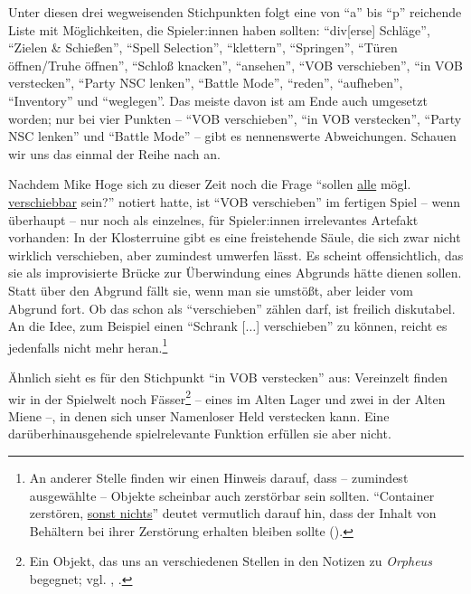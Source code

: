 \documentclass[a5paper,pagesize,numbers=noenddot]{scrbook}
\begin{document}
Unter diesen drei wegweisenden Stichpunkten folgt eine von \enquote{a} bis \enquote{p} reichende Liste mit Möglichkeiten, die Spieler:innen haben sollten:
\enquote{div[erse] Schläge}, \enquote{Zielen \& Schießen}, \enquote{Spell Selection}, \enquote{klettern}, \enquote{Springen}, \enquote{Türen öffnen/Truhe öffnen}, \enquote{Schloß knacken}, \enquote{ansehen}, \enquote{VOB verschieben}, \enquote{in VOB verstecken}, \enquote{Party NSC lenken}, \enquote{Battle Mode}, \enquote{reden}, \enquote{aufheben}, \enquote{Inventory} und \enquote{weglegen}.
Das meiste davon ist am Ende auch umgesetzt worden; nur bei vier Punkten -- \enquote{VOB verschieben}, \enquote{in VOB verstecken}, \enquote{Party NSC lenken} und \enquote{Battle Mode} -- gibt es nennenswerte Abweichungen.
Schauen wir uns das einmal der Reihe nach an.

Nachdem Mike Hoge sich zu dieser Zeit noch die Frage \enquote{sollen \uline{alle} mögl. \uline{verschiebbar} sein?}\autocite[S.~3]{orpheus_interface} notiert hatte, ist \enquote{VOB verschieben} im fertigen Spiel -- wenn überhaupt -- nur noch als einzelnes, für Spieler:innen irrelevantes Artefakt vorhanden:
In der Klosterruine gibt es eine freistehende Säule, die sich zwar nicht wirklich verschieben, aber zumindest umwerfen lässt.
Es scheint offensichtlich, das sie als improvisierte Brücke zur Überwindung eines Abgrunds hätte dienen sollen.
Statt über den Abgrund fällt sie, wenn man sie umstößt, aber leider vom Abgrund fort.
Ob das schon als \enquote{verschieben} zählen darf, ist freilich diskutabel.
An die Idee, zum Beispiel einen \enquote{Schrank [$\ldots$] verschieben}\autocite[S.~3]{orpheus_interface} zu können, reicht es jedenfalls nicht mehr heran.\footnote{An anderer Stelle finden wir einen Hinweis darauf, dass -- zumindest ausgewählte -- Objekte scheinbar auch zerstörbar sein sollten.
\enquote{Container zerstören, \uline{sonst nichts}} deutet vermutlich darauf hin, dass der Inhalt von Behältern bei ihrer Zerstörung erhalten bleiben sollte (\autocite[S.~9]{orpheus_b_scribbles}).}

Ähnlich sieht es für den Stichpunkt \enquote{in VOB verstecken} aus:
Vereinzelt finden wir in der Spielwelt noch Fässer\footnote{Ein Objekt, das uns an verschiedenen Stellen in den Notizen zu \textit{Orpheus} begegnet; vgl. \autocite[S.~19]{orpheus_b_scribbles}, \autocite[S.~6]{orpheus_interface}.} -- eines im Alten Lager und zwei in der Alten Miene --, in denen sich unser Namenloser Held verstecken kann.
Eine darüberhinausgehende spielrelevante Funktion erfüllen sie aber nicht.
\end{document}
